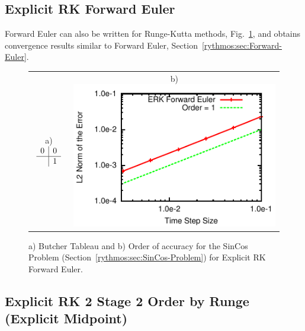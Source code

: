 \subsection{Explicit RK Forward Euler}

Forward Euler can also be written for Runge-Kutta methods, Fig.~\ref{rythmos:fig:ERK-ForwardEuler},
and obtains convergence results similar to Forward Euler, Section~\ref{rythmos:sec:Forward-Euler}.
\begin{figure}[H]
\centering{}%
\begin{tabular}{cc}
a)$\begin{array}{c|c}
0 & 0\\
\hline  & 1
\end{array}$ & b)\includegraphics[scale=1.5]{figures/ERK_ForwardEuler}\tabularnewline
\end{tabular}\caption{a) Butcher Tableau and b) Order of accuracy for the SinCos Problem
(Section~\ref{rythmos:sec:SinCos-Problem}) for Explicit RK Forward
Euler.\label{rythmos:fig:ERK-ForwardEuler}}
\end{figure}



\subsection{Explicit RK 2 Stage 2 Order by Runge (Explicit Midpoint)}

